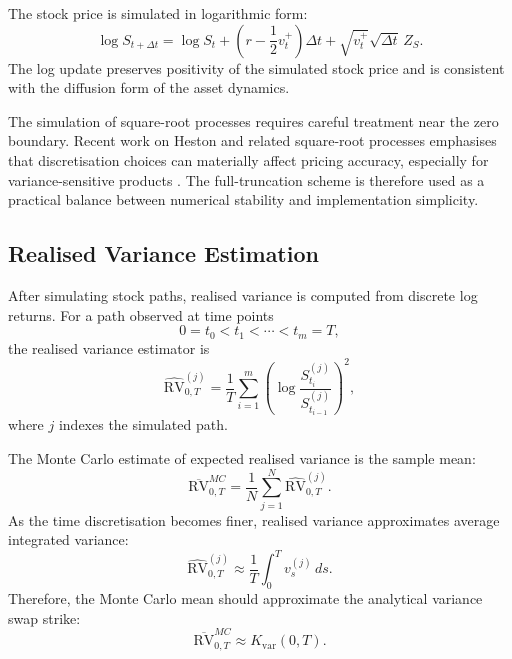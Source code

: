 The stock price is simulated in logarithmic form:
\begin{equation}
\log S_{t+\Delta t}
=
\log S_t
+
\left(r-\frac{1}{2}v_t^+\right)\Delta t
+
\sqrt{v_t^+}\sqrt{\Delta t}\,Z_S.
\label{eq:mc_stock_update}
\end{equation}
The log update preserves positivity of the simulated stock price and is consistent with the diffusion form of the asset dynamics.

The simulation of square-root processes requires careful treatment near the zero boundary. Recent work on Heston and related square-root processes emphasises that discretisation choices can materially affect pricing accuracy, especially for variance-sensitive products \citep{choikwok2024heston,abijaber2024squareroot}. The full-truncation scheme is therefore used as a practical balance between numerical stability and implementation simplicity.

\subsection{Realised Variance Estimation}

After simulating stock paths, realised variance is computed from discrete log returns. For a path observed at time points
\[
0=t_0<t_1<\cdots<t_m=T,
\]
the realised variance estimator is
\begin{equation}
\widehat{\mathrm{RV}}_{0,T}^{(j)}
=
\frac{1}{T}
\sum_{i=1}^{m}
\left(
\log\frac{S_{t_i}^{(j)}}{S_{t_{i-1}}^{(j)}}
\right)^2,
\label{eq:mc_realised_variance}
\end{equation}
where \(j\) indexes the simulated path.

The Monte Carlo estimate of expected realised variance is the sample mean:
\begin{equation}
\overline{\mathrm{RV}}_{0,T}^{MC}
=
\frac{1}{N}
\sum_{j=1}^{N}
\widehat{\mathrm{RV}}_{0,T}^{(j)}.
\end{equation}
As the time discretisation becomes finer, realised variance approximates average integrated variance:
\begin{equation}
\widehat{\mathrm{RV}}_{0,T}^{(j)}
\approx
\frac{1}{T}
\int_0^T v_s^{(j)}\,ds.
\end{equation}
Therefore, the Monte Carlo mean should approximate the analytical variance swap strike:
\begin{equation}
\overline{\mathrm{RV}}_{0,T}^{MC}
\approx
K_{\mathrm{var}}(0,T).
\end{equation}


